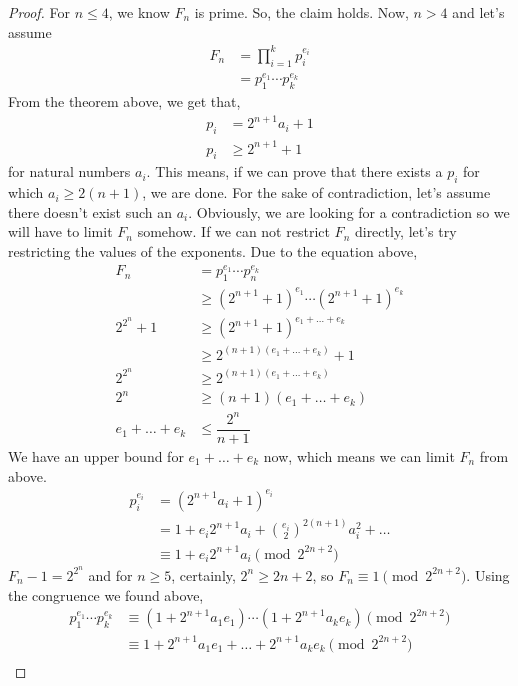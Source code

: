 \documentclass{subfile}
\begin{document}
		\begin{proof}
			For $n\leq4$, we know $F_n$ is prime. So, the claim holds. Now, $n>4$ and let's assume
				\begin{align*}
					F_n & = \prod_{i=1}^{k}p_i^{e_i}\\
						& = p_1^{e_1}\cdots p_k^{e_k}
				\end{align*}
			From the theorem above, we get that,
				\begin{align*}
					p_i & = 2^{n+1}a_i+1\\
					p_i &\geq2^{n+1}+1
				\end{align*}
			for natural numbers $a_i$. This means, if we can prove that there exists a $p_i$ for which $a_i\geq2(n+1)$, we are done. For the sake of contradiction, let's assume there doesn't exist such an $a_i$. Obviously, we are looking for a contradiction so we will have to limit $F_n$ somehow. If we can not restrict $F_n$ directly, let's try restricting the values of the exponents. Due to the equation above,
				\begin{align*}
					F_n & = p_1^{e_1}\cdots p_n^{e_k}\\
						&\geq \left(2^{n+1}+1\right)^{e_1}\cdots\left(2^{n+1}+1\right)^{e_k}\\
					2^{2^n}+1&\geq\left(2^{n+1}+1\right)^{e_1+\ldots+e_k}\\
							 &\geq2^{(n+1)(e_1+\ldots+e_k)}+1\\
					2^{2^n}  &\geq2^{(n+1)(e_1+\ldots+e_k)}\\
					2^n		 &\geq(n+1)(e_1+\ldots+e_k)\\
					e_1+\ldots+e_k&\leq\dfrac{2^n}{n+1}
				\end{align*}
			We have an upper bound for $e_1+\ldots+e_k$ now, which means we can limit $F_n$ from above.
				\begin{align*}
					p_i^{e_i} & = (2^{n+1}a_i+1)^{e_i}\\
							  & = 1+e_i2^{n+1}a_i+\binom{e_i}2^{2(n+1)}a_i^2+\ldots\\
							  &\equiv1+e_i2^{n+1}a_i\pmod{2^{2n+2}}
				\end{align*}
			$F_n-1=2^{2^n}$ and for $n\geq5$, certainly, $2^n\geq2n+2$, so $F_n\equiv1\pmod{2^{2n+2}}$. Using the congruence we found above,
				\begin{align*}
					p_1^{e_1}\cdots p_k^{e_k} &\equiv(1+2^{n+1}a_1e_1)\cdots(1+2^{n+1}a_ke_k)\pmod{2^{2n+2}}\\
											  &\equiv1+2^{n+1}a_1e_1+\ldots+2^{n+1}a_ke_k\pmod{2^{2n+2}}\\

\end{align*}
\end{proof}
\end{document}

